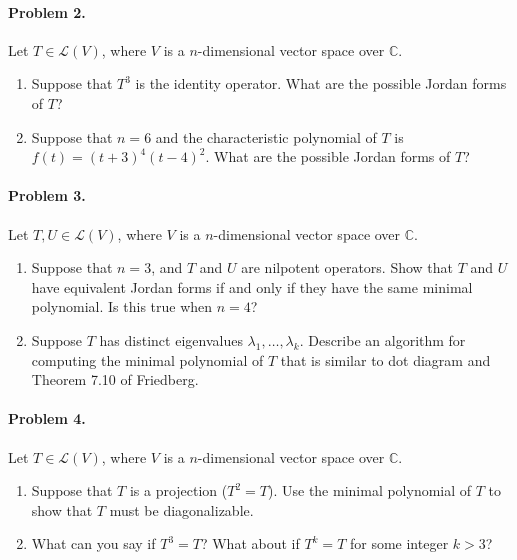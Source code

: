 \documentclass{article}
\begin{document}
\paragraph*{Problem 2.} Let $T\in\mathcal{L}(V)$, where $V$ is a $n$-dimensional vector space over $\mathbb{C}$. 
\renewcommand{\theenumi}{\alph{enumi}}
\begin{enumerate}
\item	Suppose that $T^{3}$ is the identity operator. What are the possible Jordan forms of $T$?
\item	Suppose that $n=6$ and the characteristic polynomial of $T$ is $f(t)=(t+3)^{4}(t-4)^{2}$. What are the possible Jordan forms of $T$?
\end{enumerate}

\paragraph*{Problem 3.} Let $T,U\in\mathcal{L}(V)$, where $V$ is a $n$-dimensional vector space over $\mathbb{C}$. 
\begin{enumerate}
\item	Suppose that $n=3$, and $T$ and $U$ are nilpotent operators. Show that $T$ and $U$ have equivalent Jordan forms if and only if they have the same minimal polynomial. Is this true when $n=4$?
\item	Suppose $T$ has distinct eigenvalues $\lambda_{1},\ldots,\lambda_{k}$. Describe an algorithm for computing the minimal polynomial of $T$ that is similar to dot diagram and Theorem 7.10 of Friedberg. 
\end{enumerate}

\paragraph*{Problem 4.} Let $T\in\mathcal{L}(V)$, where $V$ is a $n$-dimensional vector space over $\mathbb{C}$. 
\begin{enumerate}
\item	Suppose that $T$ is a projection ($T^{2}=T$). Use the minimal polynomial of $T$ to show that $T$ must be diagonalizable. 
\item	What can you say if $T^{3}=T$? What about if $T^{k}=T$ for some integer $k>3$?
\end{enumerate}
\end{document}
